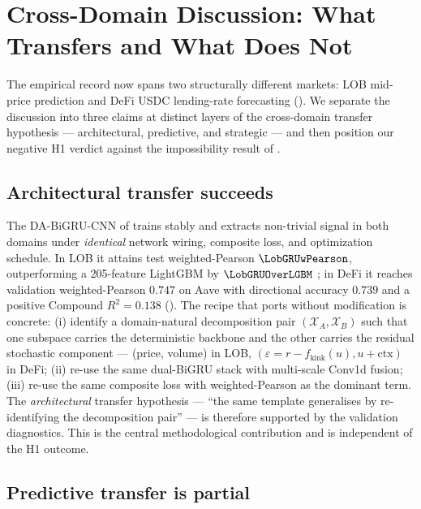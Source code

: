\section{Cross-Domain Discussion: What Transfers and What Does Not}
\label{sec:discussion}

The empirical record now spans two structurally different markets:
LOB mid-price prediction \cite{solovev2026lob} and DeFi USDC lending-rate
forecasting ().  We separate the discussion
into three claims at distinct layers of the cross-domain transfer
hypothesis --- architectural, predictive, and strategic --- and then
position our negative H1 verdict against the impossibility result of
\cite{halpern2024fair}.

\subsection{Architectural transfer succeeds}
\label{sec:disc-arch}

The DA-BiGRU-CNN of  trains stably and
extracts non-trivial signal in both domains under \emph{identical}
network wiring, composite loss, and optimization schedule.  In LOB it
attains test weighted-Pearson $\LobGRUwPearson$, outperforming a
205-feature LightGBM by $\LobGRUOverLGBM$
\cite{solovev2026lob,ke2017lightgbm}; in DeFi it reaches validation
weighted-Pearson $0.747$ on Aave with directional accuracy $0.739$ and
a positive Compound $R^{2}=0.138$ ().  The
recipe that ports without modification is concrete: (i) identify a
domain-natural decomposition pair $(\mathcal{X}_A, \mathcal{X}_B)$
such that one subspace carries the deterministic backbone and the
other carries the residual stochastic component --- (price, volume) in
LOB, $(\varepsilon = r - f_{\text{kink}}(u), u+\text{ctx})$ in DeFi;
(ii) re-use the same dual-BiGRU stack with multi-scale Conv1d fusion;
(iii) re-use the same composite loss with weighted-Pearson as the
dominant term.  The \emph{architectural} transfer hypothesis ---
``the same template generalises by re-identifying the decomposition
pair'' --- is therefore supported by the validation diagnostics.  This
is the central methodological contribution and is independent of the
H1 outcome.

\subsection{Predictive transfer is partial}
\label{sec:disc-pred}

